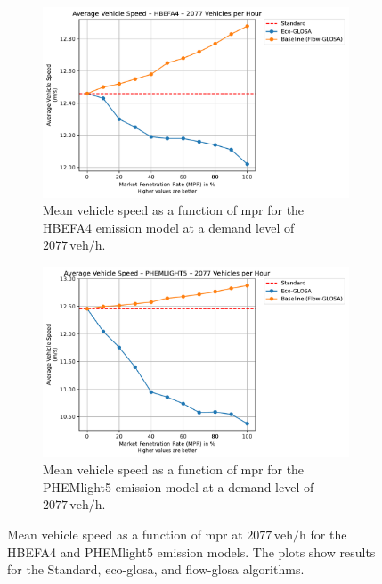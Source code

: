 \begin{figure}[htb]
  \centering
  \begin{subfigure}[b]{0.49\textwidth}
    \includegraphics[width=\textwidth]{data/img/AverageVehicleSpeed/AverageVehicleSpeed_HBEFA4_Cars2077.pdf}
    \caption{Mean vehicle speed as a function of \ac{mpr} for the HBEFA4 emission model at a demand level of $2077\,\mathrm{veh/h}$.}
    \label{fig:MeanSpeed_HBEFA4_2077}
  \end{subfigure}\hfill
  \begin{subfigure}[b]{0.49\textwidth}
    \includegraphics[width=\textwidth]{data/img/AverageVehicleSpeed/AverageVehicleSpeed_PHEMLIGHT5_Cars2077.pdf}
    \caption{Mean vehicle speed as a function of \ac{mpr} for the PHEMlight5 emission model at a demand level of $2077\,\mathrm{veh/h}$.}
    \label{fig:MeanSpeed_PHEM_2077}
  \end{subfigure}
  \caption{Mean vehicle speed as a function of \ac{mpr} at $2077\,\mathrm{veh/h}$ for the HBEFA4 and PHEMlight5 emission models. The plots show results for the Standard, \ac{eco-glosa}, and \ac{flow-glosa} algorithms.}
  \label{fig:MeanSpeed_2077}
\end{figure}


